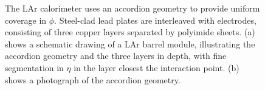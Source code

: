 \begin{figure}[htbp]
	\centering
	\caption{The LAr calorimeter uses an accordion geometry to provide uniform coverage in $\phi$. Steel-clad lead plates are interleaved with electrodes, consisting of three copper layers separated by polyimide sheets. (a) shows a schematic drawing of a LAr barrel module, illustrating the accordion geometry and the three layers in depth, with fine segmentation in $\eta$ in the layer closest the interaction point. (b) shows a photograph of the accordion geometry.}
	\label{fig:ATLAS-LAr-module}
\end{figure}

